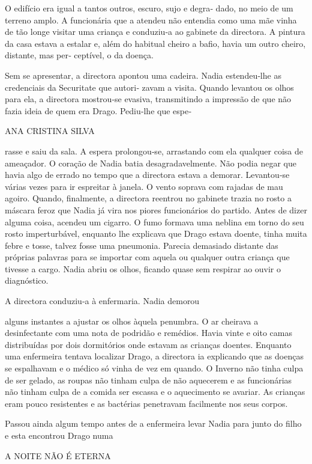 O edifício era igual a tantos outros, escuro, sujo e degra‑ dado, no
meio de um terreno amplo. A funcionária que a atendeu não entendia como
uma mãe vinha de tão longe visitar uma criança e conduziu‑a ao gabinete
da directora. A pintura da casa estava a estalar e, além do habitual
cheiro a bafio, havia um outro cheiro, distante, mas per‑ ceptível, o da
doença.

Sem se apresentar, a directora apontou uma cadeira. Nadia estendeu‑lhe
as credenciais da Securitate que autori‑ zavam a visita. Quando levantou
os olhos para ela, a directora mostrou‑se evasiva, transmitindo a
impressão de que não fazia ideia de quem era Drago. Pediu‑lhe que espe‑

ANA CRISTINA SILVA

rasse e saiu da sala. A espera prolongou‑se, arrastando com ela qualquer
coisa de ameaçador. O coração de Nadia batia desagradavelmente. Não
podia negar que havia algo de errado no tempo que a directora estava a
demorar. Levantou‑se várias vezes para ir espreitar à janela. O vento
soprava com rajadas de mau agoiro. Quando, finalmente, a directora
reentrou no gabinete trazia no rosto a máscara feroz que Nadia já vira
nos piores funcionários do partido. Antes de dizer alguma coisa, acendeu
um cigarro. O fumo formava uma neblina em torno do seu rosto
imperturbável, enquanto lhe explicava que Drago estava doente, tinha
muita febre e tosse, talvez fosse uma pneumonia. Parecia demasiado
distante das próprias palavras para se importar com aquela ou qualquer
outra criança que tivesse a cargo. Nadia abriu os olhos, ficando quase
sem respirar ao ouvir o diagnóstico.

A directora conduziu‑a à enfermaria. Nadia demorou

alguns instantes a ajustar os olhos àquela penumbra. O ar cheirava a
desinfectante com uma nota de podridão e remédios. Havia vinte e oito
camas distribuídas por dois dormitórios onde estavam as crianças
doentes. Enquanto uma enfermeira tentava localizar Drago, a directora ia
explicando que as doenças se espalhavam e o médico só vinha de vez em
quando. O Inverno não tinha culpa de ser gelado, as roupas não tinham
culpa de não aquecerem e as funcionárias não tinham culpa de a comida
ser escassa e o aquecimento se avariar. As crianças eram pouco
resistentes e as bactérias penetravam facilmente nos seus corpos.

Passou ainda algum tempo antes de a enfermeira levar Nadia para junto do
filho e esta encontrou Drago numa

A NOITE NÃO É ETERNA

